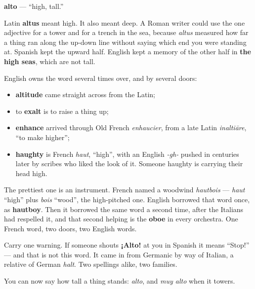 \begin{cousinweb}
\textbf{alto} — \textquotedblleft{}high, tall.\textquotedblright{}

Latin \textbf{altus} meant high. It also meant deep. A Roman writer could use the one adjective for a tower and for a trench in the sea, because \emph{altus} measured how far a thing ran along the up-down line without saying which end you were standing at. Spanish kept the upward half. English kept a memory of the other half in \textbf{the high seas}, which are not tall.

English owns the word several times over, and by several doors:

\begin{itemize}
\raggedright
  \item \textbf{altitude} came straight across from the Latin;
  \item to \textbf{exalt} is to raise a thing up;
  \item \textbf{enhance} arrived through Old French \emph{enhaucier}, from a late Latin \emph{inaltiāre}, \textquotedblleft{}to make higher\textquotedblright{};
  \item \textbf{haughty} is French \emph{haut}, \textquotedblleft{}high\textquotedblright{}, with an English \emph{-gh-} pushed in centuries later by scribes who liked the look of it. Someone haughty is carrying their head high.
\end{itemize}

The prettiest one is an instrument. French named a woodwind \emph{hautbois} — \emph{haut} \textquotedblleft{}high\textquotedblright{} plus \emph{bois} \textquotedblleft{}wood\textquotedblright{}, the high-pitched one. English borrowed that word once, as \textbf{hautboy}. Then it borrowed the same word a second time, after the Italians had respelled it, and that second helping is the \textbf{oboe} in every orchestra. One French word, two doors, two English words.

Carry one warning. If someone shouts \textbf{¡Alto!} at you in Spanish it means \textquotedblleft{}Stop!\textquotedblright{} — and that is not this word. It came in from Germanic by way of Italian, a relative of German \emph{halt}. Two spellings alike, two families.
\end{cousinweb}

\begin{grammarlens}[title={What you've built}]
You can now say how tall a thing stands: \emph{alto}, and \emph{muy alto} when it towers.
\end{grammarlens}

